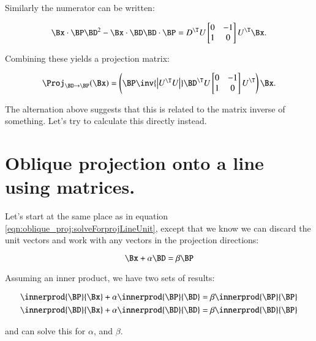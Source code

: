 Similarly the numerator can be written:

\[
\Bx \cdot \BP \BD^2 - \Bx \cdot \BD \BD \cdot \BP =
D^\T U
\begin{bmatrix}
0 & -1 \\
1 & 0 \\
\end{bmatrix}
U^\T \Bx.
\]

Combining these yields a projection matrix:

\begin{equation}\label{eqn:oblique_proj:matrixprojfromwedge}
\Proj_{\BD \rightarrow \BP}(\Bx) =
\left(
\BP
\inv{
\begin{vmatrix}
U^\T U
\end{vmatrix}
}
\BD^\T U
\begin{bmatrix}
0 & -1 \\
1 & 0 \\
\end{bmatrix}
U^\T\right) \Bx.
\end{equation}

The alternation above suggests that this is related to the matrix inverse of something.  Let's try to calculate this directly instead.

\section{Oblique projection onto a line using matrices. }

Let's start at the same place as in equation \ref{eqn:oblique_proj:solveForprojLineUnit}, except that we know we can discard the unit vectors and work with any vectors in the projection directions:

\begin{equation}\label{eqn:oblique_proj:solveForprojLineNonUnit}
\Bx + \alpha \BD = \beta \BP
\end{equation}

Assuming an inner product, we have two sets of results:

\begin{align*}
\innerprod{\BP}{\Bx} + \alpha \innerprod{\BP}{\BD} &= \beta \innerprod{\BP}{\BP} \\
\innerprod{\BD}{\Bx} + \alpha \innerprod{\BD}{\BD} &= \beta \innerprod{\BD}{\BP} \\
\end{align*}

and can solve this for $\alpha$, and $\beta$.

